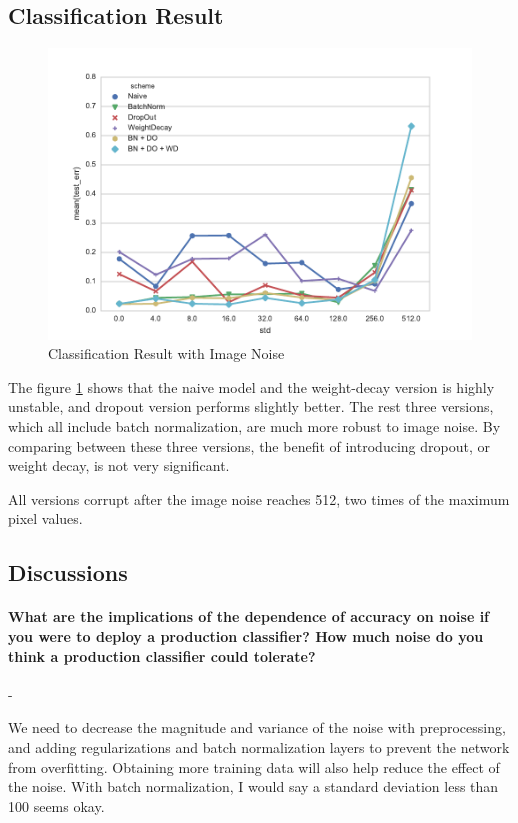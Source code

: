 \documentclass[11pt]{article}
\begin{document}
\subsection{Classification Result}
\begin{figure}
    \includegraphics[width=.9\textwidth]{Figs/exp2_1}
    \caption{Classification Result with Image Noise}\label{fig:exp21}
\end{figure}
The figure \ref{fig:exp21} shows that the naive model and the weight-decay version is highly unstable, and dropout version performs slightly better. The rest three versions, which all include batch normalization, are much more robust to image noise. By comparing between these three versions, the benefit of introducing dropout, or weight decay, is not very significant.

All versions corrupt after the image noise reaches 512, two times of the maximum pixel values. 

\subsection{Discussions}
\paragraph{What are the implications of the dependence of accuracy on noise if you were to deploy a production classifier? How much noise do you think a production classifier could tolerate?} -

We need to decrease the magnitude and variance of the noise with preprocessing, and adding regularizations and batch normalization layers to prevent the network from overfitting. Obtaining more training data will also help reduce the effect of the noise. With batch normalization, I would say a standard deviation less than 100 seems okay.
\end{document}
